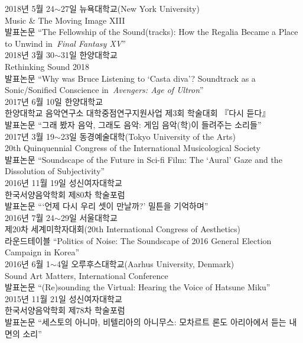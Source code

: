 \documentclass[dvipdfmx,a4paper]{article}
\begin{document}
  \noindent 2018년 5월 24$\sim$27일 뉴욕대학교(New York University)\\
  Music \& The Moving Image XIII\\
  발표논문 “The Fellowship of the Sound(tracks): How the Regalia Became a Place to Unwind in \textit{Final Fantasy XV}”\\
  
  \noindent 2018년 3월 30$\sim$31일 한양대학교\\
  Rethinking Sound 2018\\
  발표논문 “Why was Bruce Listening to ‘Casta diva’? Soundtrack as a Sonic/Sonified Conscience in \textit{Avengers: Age of Ultron}”\\
  
  \noindent 2017년 6월 10일 한양대학교\\
  한양대학교 음악연구소 대학중점연구지원사업 제3회 학술대회 『다시 듣다』\\
  발표논문 “그래 봤자 음악, 그래도 음악: 게임 음악(학)이 들려주는 소리들”\\
  
  \noindent 2017년 3월 19$\sim$23일 동경예술대학(Tokyo University of the Arts)\\
  20th Quinquennial Congress of the International Musicological Society\\
  발표논문 “Soundscape of the Future in Sci-fi Film: The ‘Aural’ Gaze and the Dissolution of Subjectivity”\\
  
  \noindent 2016년 11월 19일 성신여자대학교\\
  한국서양음악학회 제80차 학술포럼\\
  발표논문 “‘언제 다시 우리 셋이 만날까?’ 밀튼을 기억하며”\\
  
  \noindent 2016년 7월 24$\sim$29일 서울대학교\\
  제20차 세계미학자대회(20th International Congress of Aesthetics)\\
  라운드테이블 “Politics of Noise: The Soundscape of 2016 General Election Campaign in Korea”\\
  
  \noindent 2016년 6월 1$\sim$4일 오루후스대학교(Aarhus University, Denmark)\\
  Sound Art Matters, International Conference\\
  발표논문 “(Re)sounding the Virtual: Hearing the Voice of Hatsune Miku”\\
  
  \noindent 2015년 11월 21일 성신여자대학교\\
  한국서양음악학회 제78차 학술포럼\\
  발표논문 “세스토의 아니마, 비텔리아의 아니무스: 모차르트 론도 아리아에서 듣는 내면의 소리”\\
  
\end{document}
